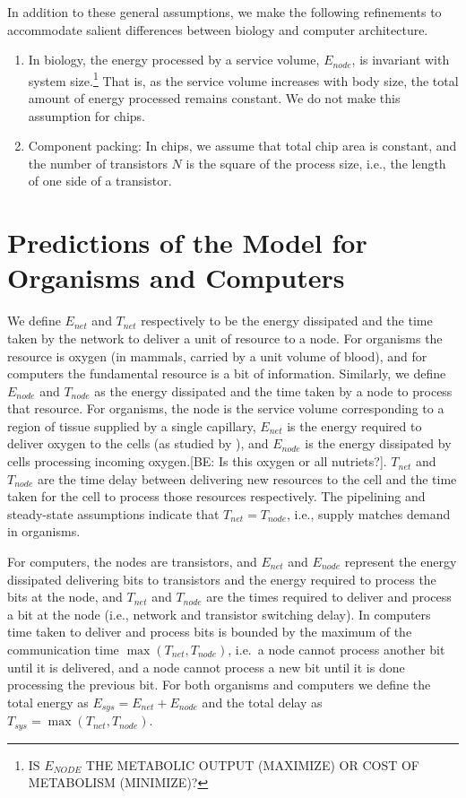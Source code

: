 \documentclass[12pt]{article}
\begin{document}
In addition to these general assumptions, we make the following
refinements to accommodate salient differences between biology and computer architecture.
\begin{enumerate}
\item In biology, the energy processed by a service volume,
  $E_{node}$, is invariant with system size.\footnote{IS $E_{NODE}$ THE METABOLIC OUTPUT (MAXIMIZE) OR COST OF METABOLISM
  (MINIMIZE)?}  That is, as the service volume
  increases with body size, the total amount of energy processed
  remains constant.   We do not make this assumption for chips.

\item Component packing: In chips, we assume that total chip area is constant, and the
  number of transistors $N$ is the square of the process size, i.e.,
  the length of one side of a transistor. 

\end{enumerate}



\section{Predictions of the Model for Organisms and Computers}

We define $E_{net}$ and $T_{net}$ respectively to be the energy dissipated and
the time taken by the network to deliver a unit of resource to a node.  For
organisms the resource is oxygen (in mammals, carried by a unit volume of
blood), and for computers the fundamental resource is a bit of information.
Similarly, we define $E_{node}$ and $T_{node}$ as the energy dissipated and the
time taken by a node to process that resource.  For organisms, the node is the
service volume corresponding to a region of tissue supplied by a single
capillary, $E_{net}$ is the energy required to deliver oxygen to the cells (as
studied by \cite{west97}), and $E_{node}$ is the energy dissipated by cells
processing incoming oxygen.[BE: Is this oxygen or all nutriets?]. $T_{net}$ and
$T_{node}$ are the time delay between delivering new resources to the cell and
the time taken for the cell to process those resources respectively. The
pipelining and steady-state assumptions indicate that $T_{net} = T_{node}$,
i.e., supply matches demand in organisms.

For computers, the nodes are transistors, and 
$E_{net}$ and $E_{node}$ represent the energy dissipated delivering bits to
transistors and the energy required to process the bits at the node, and
$T_{net}$ and $T_{node}$ are the times required to deliver and process a bit at
the node (i.e., network and transistor switching delay).  In computers time
taken to deliver and process bits is bounded by the maximum of the
communication time $\max(T_{net},T_{node})$, i.e.\ a node cannot process
another bit until it is delivered, and a node cannot process a new bit until it
is done processing the previous bit. For both organisms and computers we define
the total energy as $E_{sys} = E_{net} + E_{node}$ and the total delay as
$T_{sys} = \max(T_{net},T_{node})$.
\end{document}
